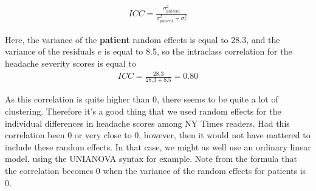 \documentclass[]{book}\usepackage[]{graphicx}\usepackage[]{color}
\begin{document}
\begin{eqnarray}
ICC = \frac{\sigma^2_{patient} } {\sigma^2_{patient} +\sigma^2_e }   
\end{eqnarray}

Here, the variance of the \textbf{patient} random effects is equal to 28.3, and the variance of the residuals $e$ is equal to 8.5, so the intraclass correlation for the headache severity scores is equal to 
\begin{eqnarray}
ICC = \frac{28.3} {28.3 + 8.5 } =  0.80
\end{eqnarray}

As this correlation is quite higher than 0, there seems to be quite a lot of clustering. Therefore it's a good thing that we used random effects for the individual differences in headache scores among NY Times readers. Had this correlation been 0 or very close to 0, however, then it would not have mattered to include these random effects. In that case, we might as well use an ordinary linear model, using the UNIANOVA syntax for example. Note from the formula that the correlation becomes 0 when the variance of the random effects for patients is 0.
\\
\\
\end{document}
